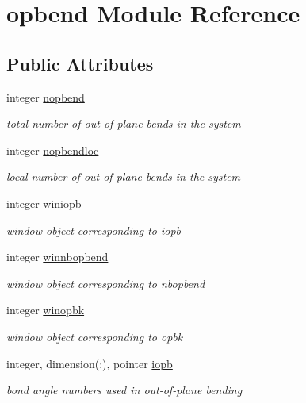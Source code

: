 \hypertarget{classopbend}{\section{opbend Module Reference}
\label{classopbend}
}
\subsection*{Public Attributes}
\begin{DoxyCompactItemize}
\item 
integer \hyperlink{classopbend_ad0f7b4a83e73f1dc6ff0c96122c2cc83}{nopbend}
\begin{DoxyCompactList}\small\item\em total number of out-\/of-\/plane bends in the system \end{DoxyCompactList}\item 
integer \hyperlink{classopbend_a835913f8c85f8b8af5bd6299d3ff7b1f}{nopbendloc}
\begin{DoxyCompactList}\small\item\em local number of out-\/of-\/plane bends in the system \end{DoxyCompactList}\item 
integer \hyperlink{classopbend_a6e063018cd228d297b843bdc4cd4ca2e}{winiopb}
\begin{DoxyCompactList}\small\item\em window object corresponding to iopb \end{DoxyCompactList}\item 
integer \hyperlink{classopbend_ae748e888973e590e2129f8f875a3129c}{winnbopbend}
\begin{DoxyCompactList}\small\item\em window object corresponding to nbopbend \end{DoxyCompactList}\item 
integer \hyperlink{classopbend_afec81e6108d178f247fe889ad1571bf3}{winopbk}
\begin{DoxyCompactList}\small\item\em window object corresponding to opbk \end{DoxyCompactList}\item 
integer, dimension(\-:), pointer \hyperlink{classopbend_a37701e35e72211c5764cf3445f159a8f}{iopb}
\begin{DoxyCompactList}\small\item\em bond angle numbers used in out-\/of-\/plane bending \end{DoxyCompactList}\item 

\end{DoxyCompactItemize}
